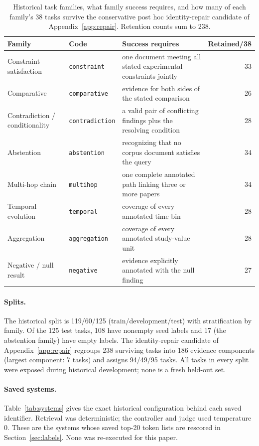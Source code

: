 \begin{table}[h]
\centering
\small
\caption{Historical task families, what family success requires, and how many of each family's 38 tasks survive the conservative post hoc identity-repair candidate of Appendix~\ref{app:repair}. Retention counts sum to 238.}
\label{tab:families}
\begin{tabular}{@{}ll>{\raggedright\arraybackslash}p{4.9cm}r@{}}
\toprule
Family & Code & Success requires & Retained/38 \\
\midrule
Constraint satisfaction & \texttt{constraint} & one document meeting all stated experimental constraints jointly & 33 \\
Comparative & \texttt{comparative} & evidence for both sides of the stated comparison & 26 \\
Contradiction / conditionality & \texttt{contradiction} & a valid pair of conflicting findings plus the resolving condition & 28 \\
Abstention & \texttt{abstention} & recognizing that no corpus document satisfies the query & 34 \\
Multi-hop chain & \texttt{multihop} & one complete annotated path linking three or more papers & 34 \\
Temporal evolution & \texttt{temporal} & coverage of every annotated time bin & 28 \\
Aggregation & \texttt{aggregation} & coverage of every annotated study-value unit & 28 \\
Negative / null result & \texttt{negative} & evidence explicitly annotated with the null finding & 27 \\
\bottomrule
\end{tabular}
\end{table}

\paragraph{Splits.}
The historical split is 119/60/125 (train/development/test) with stratification by family. Of the 125 test tasks, 108 have nonempty seed labels and 17 (the abstention family) have empty labels. The identity-repair candidate of Appendix~\ref{app:repair} regroups 238 surviving tasks into 186 evidence components (largest component: 7 tasks) and assigns 94/49/95 tasks. All tasks in every split were exposed during historical development; none is a fresh held-out set.

\paragraph{Saved systems.}
Table~\ref{tab:systems} gives the exact historical configuration behind each saved identifier. Retrieval was deterministic; the controller and judge used temperature 0. These are the systems whose saved top-20 token lists are rescored in Section~\ref{sec:labels}. None was re-executed for this paper.


